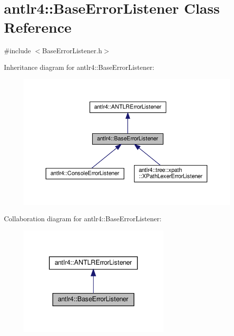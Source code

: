 \hypertarget{classantlr4_1_1BaseErrorListener}{}\section{antlr4\+:\+:Base\+Error\+Listener Class Reference}
\label{classantlr4_1_1BaseErrorListener}


{\ttfamily \#include $<$Base\+Error\+Listener.\+h$>$}



Inheritance diagram for antlr4\+:\+:Base\+Error\+Listener\+:
\nopagebreak
\begin{figure}[H]
\begin{center}
\leavevmode
\includegraphics[width=350pt]{classantlr4_1_1BaseErrorListener__inherit__graph}
\end{center}
\end{figure}


Collaboration diagram for antlr4\+:\+:Base\+Error\+Listener\+:
\nopagebreak
\begin{figure}[H]
\begin{center}
\leavevmode
\includegraphics[width=215pt]{classantlr4_1_1BaseErrorListener__coll__graph}
\end{center}
\end{figure}


